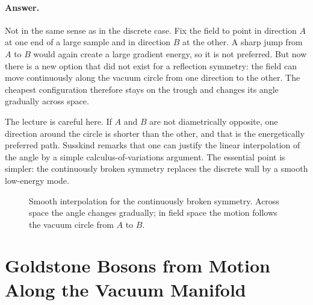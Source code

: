 \paragraph{Answer.} Not in the same sense as in the discrete case. Fix the field to point in direction \(A\) at one end of a large sample and in direction \(B\) at the other. A sharp jump from \(A\) to \(B\) would again create a large gradient energy, so it is not preferred. But now there is a new option that did not exist for a reflection symmetry: the field can move continuously along the vacuum circle from one direction to the other. The cheapest configuration therefore stays on the trough and changes its angle gradually across space.

The lecture is careful here. If \(A\) and \(B\) are not diametrically opposite, one direction around the circle is shorter than the other, and that is the energetically preferred path. Susskind remarks that one can justify the linear interpolation of the angle by a simple calculus-of-variations argument. The essential point is simpler: the continuously broken symmetry replaces the discrete wall by a smooth low-energy mode.

\begin{figure}[t]
\centering
{}
\caption{Smooth interpolation for the continuously broken symmetry. Across space the angle changes gradually; in field space the motion follows the vacuum circle from \(A\) to \(B\).}
\label{fig:lecture07-smooth-interpolation}
\end{figure}

\section{Goldstone Bosons from Motion Along the Vacuum Manifold}

